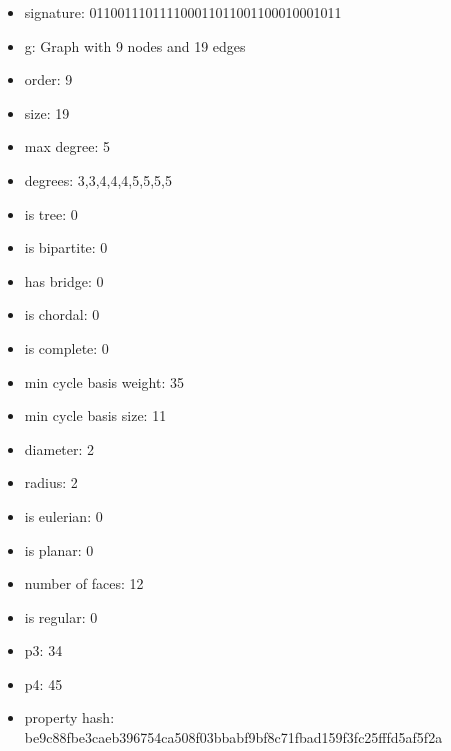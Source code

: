 \newpage
\begin{figure}
\end{figure}
\begin{itemize}
\item signature: 011001110111100011011001100010001011
\item g: Graph with 9 nodes and 19 edges
\item order: 9
\item size: 19
\item max degree: 5
\item degrees: 3,3,4,4,4,5,5,5,5
\item is tree: 0
\item is bipartite: 0
\item has bridge: 0
\item is chordal: 0
\item is complete: 0
\item min cycle basis weight: 35
\item min cycle basis size: 11
\item diameter: 2
\item radius: 2
\item is eulerian: 0
\item is planar: 0
\item number of faces: 12
\item is regular: 0
\item p3: 34
\item p4: 45
\item property hash: be9c88fbe3caeb396754ca508f03bbabf9bf8c71fbad159f3fc25fffd5af5f2a
\end{itemize}
